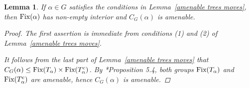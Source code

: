 \documentclass[12pt]{amsart}
\newtheorem{lem}[theorem]{Lemma}
\theoremstyle{definition}
\theoremstyle{remark}
\begin{document}
\begin{lem}\label{amenable centralizer}
If $\alpha\in G$ satisfies the conditions in Lemma~\ref{amenable trees moves}, then $\textup{Fix}(\alpha)$ has non-empty interior and $C_G(\alpha)$ is amenable.

\begin{proof}
The first assertion is immediate from conditions (1) and (2) of Lemma~\ref{amenable trees moves}.

It follows from the last part of Lemma~\ref{amenable trees moves} that $C_G(\alpha)\leq \textup{Fix}(T_\alpha)\times \textup{Fix}(T_\alpha^c)$. By \cite{boudec}*{Proposition 5.4}, both groups $\textup{Fix}(T_\alpha)$ and $\textup{Fix}(T_\alpha^c)$ are amenable, hence $C_G(\alpha)$ is amenable.
\end{proof}
\end{lem}
\end{document}
